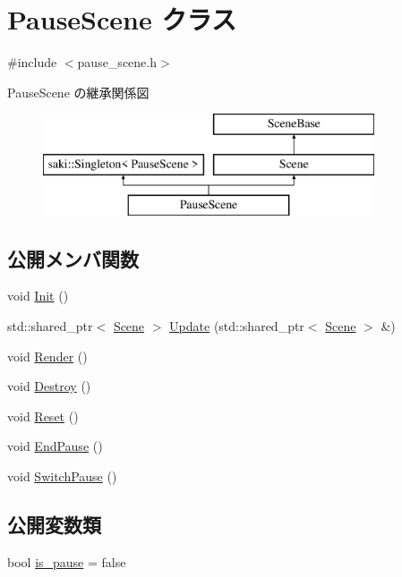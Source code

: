 \hypertarget{class_pause_scene}{}\section{Pause\+Scene クラス}
\label{class_pause_scene}


{\ttfamily \#include $<$pause\+\_\+scene.\+h$>$}

Pause\+Scene の継承関係図\begin{figure}[H]
\begin{center}
\leavevmode
\includegraphics[height=3.000000cm]{class_pause_scene}
\end{center}
\end{figure}
\subsection*{公開メンバ関数}
\begin{DoxyCompactItemize}
\item 
void \mbox{\hyperlink{class_pause_scene_ad2df77966e0ac9ef6dfa99e416498183}{Init}} ()
\item 
std\+::shared\+\_\+ptr$<$ \mbox{\hyperlink{class_scene}{Scene}} $>$ \mbox{\hyperlink{class_pause_scene_a6adfe0685eb6bc64e658f6364c9f704d}{Update}} (std\+::shared\+\_\+ptr$<$ \mbox{\hyperlink{class_scene}{Scene}} $>$ \&)
\item 
void \mbox{\hyperlink{class_pause_scene_a4eeb70d814edbe91a10e315c5e9942df}{Render}} ()
\item 
void \mbox{\hyperlink{class_pause_scene_a1ff30a4006f7b93f13305b270bc0d913}{Destroy}} ()
\item 
void \mbox{\hyperlink{class_pause_scene_add74d9bcc744eaedbd6e8e10c5ee3bcc}{Reset}} ()
\item 
void \mbox{\hyperlink{class_pause_scene_a894f114f5398caf802eaad77826b7b2c}{End\+Pause}} ()
\item 
void \mbox{\hyperlink{class_pause_scene_acc1c366b69b6de802332b4e3d7993b41}{Switch\+Pause}} ()
\end{DoxyCompactItemize}
\subsection*{公開変数類}
\begin{DoxyCompactItemize}
\item 
bool \mbox{\hyperlink{class_pause_scene_ae6b7dfe712032062c6406a05cd258756}{is\+\_\+pause}} = false
\end{DoxyCompactItemize}
